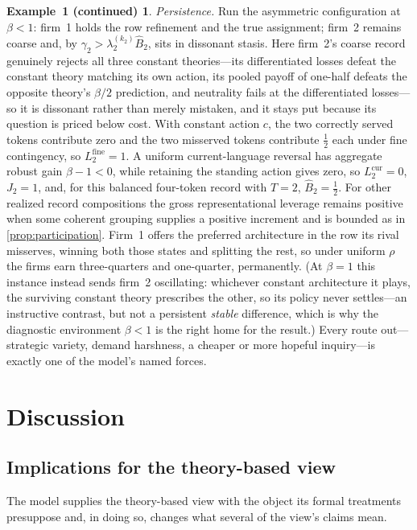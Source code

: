 \documentclass[11pt]{article}
\theoremstyle{definition}
\newtheorem*{excont}{Example~1 (continued)}
\begin{document}
\begin{excont}
\emph{Persistence.}
Run the asymmetric configuration at $\beta<1$: firm~1 holds the row refinement and the true assignment; firm~2 remains coarse and, by $\gamma_2>\lambda_2^{(k_2)}\widehat B_2$, sits in dissonant stasis.
Here firm~2's coarse record genuinely rejects all three constant theories---its differentiated losses defeat the constant theory matching its own action, its pooled payoff of one-half defeats the opposite theory's $\beta/2$ prediction, and neutrality fails at the differentiated losses---so it is dissonant rather than merely mistaken, and it stays put because its question is priced below cost.
With constant action $c$, the two correctly served tokens contribute zero and the two misserved tokens contribute $\tfrac12$ each under fine contingency, so $L_2^{\mathrm{fine}}=1$.
A uniform current-language reversal has aggregate robust gain $\beta-1<0$, while retaining the standing action gives zero, so $L_2^{\mathrm{cur}}=0$, $J_2=1$, and, for this balanced four-token record with $T=2$, $\widehat B_2=\tfrac12$.
For other realized record compositions the gross representational leverage remains positive when some coherent grouping supplies a positive increment and is bounded as in \cref{prop:participation}.
Firm~1 offers the preferred architecture in the row its rival misserves, winning both those states and splitting the rest, so under uniform $\rho$ the firms earn three-quarters and one-quarter, permanently.
(At $\beta=1$ this instance instead sends firm~2 oscillating: whichever constant architecture it plays, the surviving constant theory prescribes the other, so its policy never settles---an instructive contrast, but not a persistent \emph{stable} difference, which is why the diagnostic environment $\beta<1$ is the right home for the result.)
Every route out---strategic variety, demand harshness, a cheaper or more hopeful inquiry---is exactly one of the model's named forces.
\end{excont}
\section{Discussion}
\label{sec:discussion}

\subsection{Implications for the theory-based view}

The model supplies the theory-based view with the object its formal treatments presuppose and, in doing so, changes what several of the view's claims mean.
\end{document}
